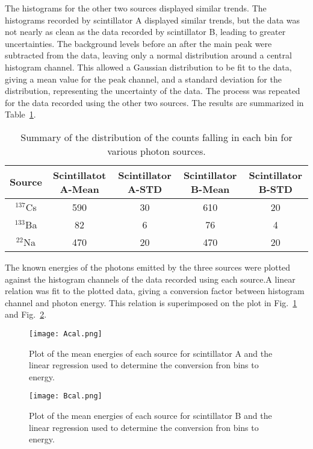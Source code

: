 \documentclass[prb,preprint,groupaddress,showpacs,superbib,floats]{revtex4-1}
\begin{document}
The histograms for the other two sources displayed similar trends. The histograms recorded by scintillator A displayed similar trends, but the data was not nearly as clean as the data recorded by scintillator B, leading to greater uncertainties.
The background levels before an after the main peak were subtracted from the data, leaving only a normal distribution around a central histogram channel. This allowed a Gaussian distribution to be fit to the data, giving a mean value for the peak channel, and a standard deviation for the distribution, representing the uncertainty of the data. The process was repeated for the data recorded using the other two sources. The results are summarized in Table~\ref{conv}. 

\begin{table}[h]
	\begin{ruledtabular}
		\begin{tabular}{ccccc}
			
			\textbf{Source} & \textbf{Scintillatot A-Mean} & \textbf{Scintillator A-STD} & \textbf{Scintillator B-Mean} & \textbf{Scintillator B-STD} \\ 
			\hline
			$^{137}$Cs & 590 & 30 &610 & 20 \\ 
			$^{133}$Ba & 82 & 6 & 76 & 4 \\ 
			$^{22}$Na & 470 & 20 & 470 & 20 \\ 
			
		\end{tabular}
	\end{ruledtabular}
	\caption{Summary of the distribution of the counts falling in each bin for various photon sources.}
	\label{conv}
\end{table}


The known energies of the photons emitted by the three sources were plotted against the histogram channels of the data recorded using each source.A linear relation was fit to the plotted data, giving a conversion factor between histogram channel and photon energy. This relation is superimposed on the plot in Fig.~\ref{Acal} and Fig.~\ref{Bcal}. 

%
\begin{figure}[h]
	\centering
	\texttt{[image: Acal.png]}
	\caption{Plot of the mean energies of each source for scintillator A and the linear regression used to determine the conversion fron bins to energy.}
	\label{Acal}
\end{figure}
%
\begin{figure}[h]
	\centering
	\texttt{[image: Bcal.png]}
	\caption{Plot of the mean energies of each source for scintillator B and the linear regression used to determine the conversion fron bins to energy.}
	\label{Bcal}
\end{figure}
\end{document}

